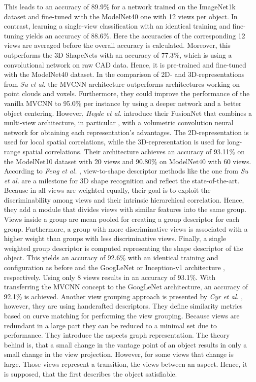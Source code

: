 This leads to an accuracy of 89.9\% for a network trained on the ImageNet1k dataset and fine-tuned with the ModelNet40 one with 12 views per object.
In contrast, learning a single-view classification with an identical training and fine-tuning yields an accuracy of 88.6\%.
Here the accuracies of the corresponding 12 views are averaged before the overall accuracy is calculated.
Moreover, this outperforms the 3D ShapeNets \cite{conf/cvpr/WuSKYZTX15} with an accuracy of 77.3\%, which is using a convolutional network on raw CAD data.
Hence, it is pre-trained and fine-tuned with the ModelNet40 dataset.
In the comparison of 2D- and 3D-representations from \textit{Su et al.} \cite{Su2018} the MVCNN architecture outperforms architectures working on point clouds and voxels.
Furthermore, they could improve the performance of the vanilla MVCNN to 95.0\% per instance by using a deeper network and a better object centering.
However, \textit{Hegde et al.} introduce their FusionNet \cite{Hegde2016FusionNet3O} that combines a multi-view architecture, in particular \cite{Su:2015:MCN:2919332.2919750}, with a volumetric convolution neural network for obtaining each representation's advantages.
The 2D-representation is used for local spatial correlations, while the 3D-representation is used for long-range spatial correlations.
Their architecture achieves an accuracy of 93.11\% on the ModelNet10 dataset with 20 views and 90.80\% on ModelNet40 with 60 views.
According to \textit{Feng et al.} \cite{Feng2018}, view-to-shape descriptor methods like the one from \textit{Su et al.} are a milestone for 3D shape recognition and reflect the state-of-the-art.
Because in \cite{Su:2015:MCN:2919332.2919750} all views are weighted equally, their goal is to exploit the discriminability among views and their intrinsic hierarchical correlation.
Hence, they add a module that divides views with similar features into the same group.
Views inside a group are mean pooled for creating a group descriptor for each group.
Furthermore, a group with more discriminative views is associated with a higher weight than groups with less discriminative views.
Finally, a single weighted group descriptor is computed representing the shape descriptor of the object.
This yields an accuracy of 92.6\% with an identical training and configuration as before and the GoogLeNet or Inception-v1 architecture \cite{szegedy2015}, respectively.
Using only 8 views results in an accuracy of 93.1\%.
With transferring the MVCNN concept to the GoogLeNet architecture, an accuracy of 92.1\% is achieved.
Another view grouping approach is presented by \textit{Cyr et al.} \cite{Cyr2004}, however, they are using handcrafted descriptors.
They define similarity metrics based on curve matching for performing the view grouping.
Because views are redundant in a large part they can be reduced to a minimal set due to performance.
They introduce the aspects graph representation.
The theory behind is, that a small change in the vantage point of an object results in only a small change in the view projection.
However, for some views that change is large.
Those views represent a transition, the views between an aspect.
Hence, it is supposed, that the first describes the object satisfiable.